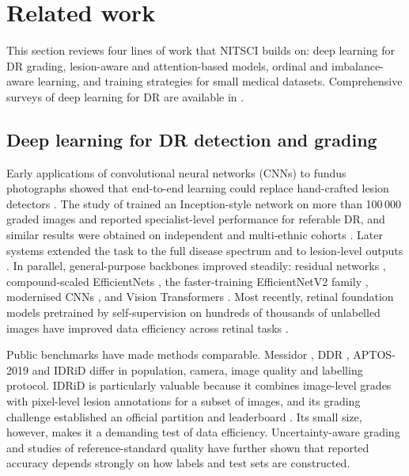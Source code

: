 \section{Related work}\label{sec:related}
This section reviews four lines of work that NITSCI builds on: deep learning for DR grading, lesion-aware and
attention-based models, ordinal and imbalance-aware learning, and training strategies for small medical datasets.
Comprehensive surveys of deep learning for DR are available in \citet{tsiknakis2021deep}.

\subsection{Deep learning for DR detection and grading}
Early applications of convolutional neural networks (CNNs) to fundus photographs showed that end-to-end learning
could replace hand-crafted lesion detectors \citep{pratt2016convolutional,abramoff2016improved}. The study of
\citet{gulshan2016development} trained an Inception-style network on more than 100\,000 graded images and reported
specialist-level performance for referable DR, and similar results were obtained on independent and multi-ethnic
cohorts \citep{gargeya2017automated,ting2017development}. Later systems extended the task to the full disease spectrum
and to lesion-level outputs \citep{dai2021deep}. In parallel, general-purpose backbones improved steadily: residual
networks \citep{he2016deep}, compound-scaled EfficientNets \citep{tan2019efficientnet}, the faster-training
EfficientNetV2 family \citep{tan2021efficientnetv2}, modernised CNNs \citep{liu2022convnet}, and Vision Transformers
\citep{dosovitskiy2021image,liu2021swin}. Most recently, retinal foundation models pretrained by self-supervision on
hundreds of thousands of unlabelled images have improved data efficiency across retinal tasks
\citep{zhou2023foundation}.

Public benchmarks have made methods comparable. Messidor \citep{decenciere2014messidor}, DDR \citep{li2019ddr},
APTOS-2019 \citep{aptos2019} and IDRiD \citep{porwal2018idrid} differ in population, camera, image quality and
labelling protocol. IDRiD is particularly valuable because it combines image-level grades with pixel-level lesion
annotations for a subset of images, and its grading challenge established an official partition and leaderboard
\citep{porwal2020idrid}. Its small size, however, makes it a demanding test of data efficiency. Uncertainty-aware
grading \citep{araujo2020drgraduate} and studies of reference-standard quality \citep{krause2018grader} have further
shown that reported accuracy depends strongly on how labels and test sets are constructed.

